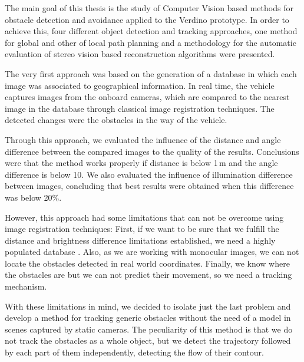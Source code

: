 

The main goal of this thesis is the study of Computer Vision based methods for obstacle detection and avoidance applied to the Verdino prototype. In order to achieve this, four different object detection and tracking approaches, one method for global and other of local path planning and a methodology for the automatic evaluation of stereo vision based reconstruction algorithms were presented.

The very first approach was based on the generation of a database in which each image was associated to geographical information. In real time, the vehicle captures images from the onboard cameras, which are compared to the nearest image in the database through classical image registration techniques. The detected changes were the obstacles in the way of the vehicle. 

Through this approach, we evaluated the influence of the distance and angle difference between the compared images to the quality of the results. Conclusions were that the method works properly if distance is below 1\,m and the angle difference is below 10\textdegree. We also evaluated the influence of illumination difference between images, concluding that best results were obtained when this difference was below 20\%.

However, this approach had some limitations that can not be overcome using image registration techniques: First, if we want to be sure that we fulfill the distance and brightness difference limitations established, we need a highly populated database . Also, as we are working with monocular images, we can not locate the obstacles detected in real world coordinates. Finally, we know where the obstacles are but we can not predict their movement, so we need a tracking mechanism.

With these limitations in mind, we decided to isolate just the last problem and develop a method for tracking generic obstacles without the need of a model in scenes captured by static cameras. The peculiarity of this method is that we do not track the obstacles as a whole object, but we detect the trajectory followed by each part of them independently, detecting the flow of their contour.

